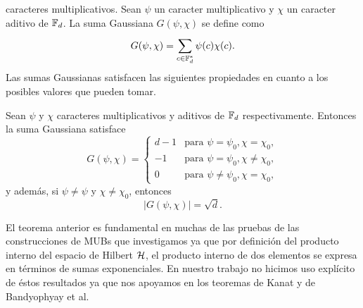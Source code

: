 caracteres multiplicativos. Sean $\psi$ un caracter
multiplicativo y $\chi$ un caracter aditivo de $\operatorname{\mathbb{F}}_d$. La
suma Gaussiana $G(\psi,\chi)$ se define como
\begin{equation}
  G(\psi,\chi)
  = \sum_{c \in \operatorname{\mathbb{F}}_d^{*}}^{} \psi(c) \chi(c).
\end{equation}
Las sumas Gaussianas satisfacen las siguientes propiedades
en cuanto a los posibles valores que pueden tomar.
\begin{theorem}
  Sean $\psi$ y $\chi$ caracteres multiplicativos y aditivos
  de $\operatorname{\mathbb{F}}_d$ respectivamente. Entonces la suma Gaussiana
  satisface
  \begin{equation}
    G(\psi,\chi)
    = \begin{cases}
      d-1 & \text{para } \psi = \psi_0, \chi = \chi_0, \\
      -1 & \text{para } \psi = \psi_0, \chi \neq \chi_0, \\
      0 & \text{para } \psi \neq \psi_0, \chi = \chi_0,
    \end{cases}
  \end{equation}
  y además, si $\psi \neq \psi$ y $\chi \neq \chi_0$,
  entonces
  \begin{equation}
    |G(\psi,\chi)| = \sqrt{d}.
  \end{equation} 
\end{theorem}
El teorema anterior es fundamental en muchas de las pruebas
de las construcciones de MUBs que investigamos ya que por
definición del producto interno del espacio de Hilbert $\operatorname{\mathcal H}$,
el producto interno de dos elementos se expresa en términos
de sumas exponenciales. En nuestro trabajo no hicimos uso
explícito de éstos resultados ya que nos apoyamos en los
teoremas de Kanat y de Bandyophyay et al.

